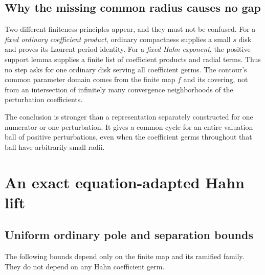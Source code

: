 \documentclass[11pt,letterpaper]{article}
\theoremstyle{definition}
\theoremstyle{remark}
\numberwithin{equation}{section}
\begin{document}
\subsection{Why the missing common radius causes no gap}
Two different finiteness principles appear, and they must not be confused.
For a \emph{fixed ordinary coefficient product}, ordinary compactness supplies
a small $s$ disk and proves its Laurent period identity. For a \emph{fixed Hahn
exponent}, the positive support lemma supplies a finite list of coefficient
products and radial terms. Thus no step asks for one ordinary disk serving
all coefficient germs. The contour's common parameter domain comes from the
finite map $f$ and its covering, not from an intersection of infinitely many
convergence neighborhoods of the perturbation coefficients.

The conclusion is stronger than a representation separately constructed for
one numerator or one perturbation. It gives a common cycle for an entire
valuation ball of positive perturbations, even when the coefficient germs
throughout that ball have arbitrarily small radii.

\section{An exact equation-adapted Hahn lift}
\label{sec:lift}

\subsection{Uniform ordinary pole and separation bounds}
The following bounds depend only on the finite map and its ramified family.
They do not depend on any Hahn coefficient germ.
\end{document}
